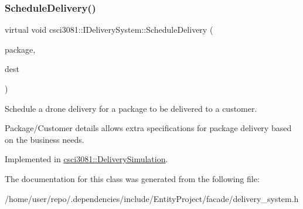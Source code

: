 \mbox{\label{classcsci3081_1_1IDeliverySystem_a25210b242623675309c16e8a2c3cfd0e}} 
\subsubsection{\texorpdfstring{Schedule\+Delivery()}{ScheduleDelivery()}}
{\footnotesize\ttfamily virtual void csci3081\+::\+I\+Delivery\+System\+::\+Schedule\+Delivery (\begin{DoxyParamCaption}\item[{\hyperlink{classentity__project_1_1IEntity}{I\+Entity} $\ast$}]{package,  }\item[{\hyperlink{classentity__project_1_1IEntity}{I\+Entity} $\ast$}]{dest }\end{DoxyParamCaption})\hspace{0.3cm}{\ttfamily [pure virtual]}}



Schedule a drone delivery for a package to be delivered to a customer. 

Package/\+Customer details allows extra specifications for package delivery based on the business needs. 

Implemented in \hyperlink{classcsci3081_1_1DeliverySimulation_a4d777e31fb067b5a5475c88116a321e1}{csci3081\+::\+Delivery\+Simulation}.



The documentation for this class was generated from the following file\+:\begin{DoxyCompactItemize}
\item 
/home/user/repo/.\+dependencies/include/\+Entity\+Project/facade/delivery\+\_\+system.\+h\end{DoxyCompactItemize}

